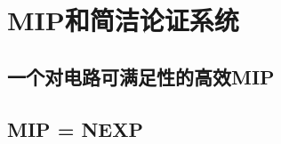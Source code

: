 \chapter{MIP和简洁论证系统}\label{chp:08MIP}
\section{一个对电路可满足性的高效MIP}\label{8.2}
\section{MIP = NEXP}\label{8.5}